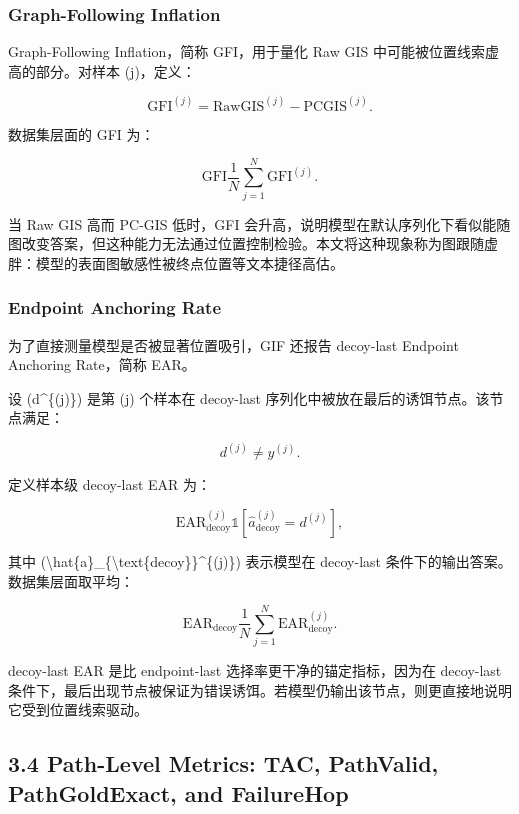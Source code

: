 \documentclass[
  11pt,
]{article}
\begin{document}
\subsubsection{Graph-Following
Inflation}\label{graph-following-inflation}

Graph-Following Inflation，简称 GFI，用于量化 Raw GIS
中可能被位置线索虚高的部分。对样本 (j)，定义：

\[
\mathrm{GFI}^{(j)}
=
\mathrm{RawGIS}^{(j)}
-
\mathrm{PCGIS}^{(j)}.
\]

数据集层面的 GFI 为：

\[
\mathrm{GFI}
\frac{1}{N}\sum_{j=1}^{N}\mathrm{GFI}^{(j)}.  
\]

当 Raw GIS 高而 PC-GIS 低时，GFI
会升高，说明模型在默认序列化下看似能随图改变答案，但这种能力无法通过位置控制检验。本文将这种现象称为图跟随虚胖：模型的表面图敏感性被终点位置等文本捷径高估。

\subsubsection{Endpoint Anchoring Rate}\label{endpoint-anchoring-rate}

为了直接测量模型是否被显著位置吸引，GIF 还报告 decoy-last Endpoint
Anchoring Rate，简称 EAR。

设 (d\^{}\{(j)\}) 是第 (j) 个样本在 decoy-last
序列化中被放在最后的诱饵节点。该节点满足：

\[
d^{(j)}\neq y^{(j)}.  
\]

定义样本级 decoy-last EAR 为：

\[
\mathrm{EAR}_{\text{decoy}}^{(j)}
\mathbb{1}  
\left[  
\hat{a}_{\text{decoy}}^{(j)}=d^{(j)}  
\right],  
\]

其中
(\textbackslash hat\{a\}\_\{\textbackslash text\{decoy\}\}\^{}\{(j)\})
表示模型在 decoy-last 条件下的输出答案。数据集层面取平均：

\[
\mathrm{EAR}_{\text{decoy}}
\frac{1}{N}\sum_{j=1}^{N}  
\mathrm{EAR}_{\text{decoy}}^{(j)}.  
\]

decoy-last EAR 是比 endpoint-last 选择率更干净的锚定指标，因为在
decoy-last
条件下，最后出现节点被保证为错误诱饵。若模型仍输出该节点，则更直接地说明它受到位置线索驱动。

\subsection{3.4 Path-Level Metrics: TAC, PathValid, PathGoldExact, and
FailureHop}\label{path-level-metrics-tac-pathvalid-pathgoldexact-and-failurehop}
\end{document}
